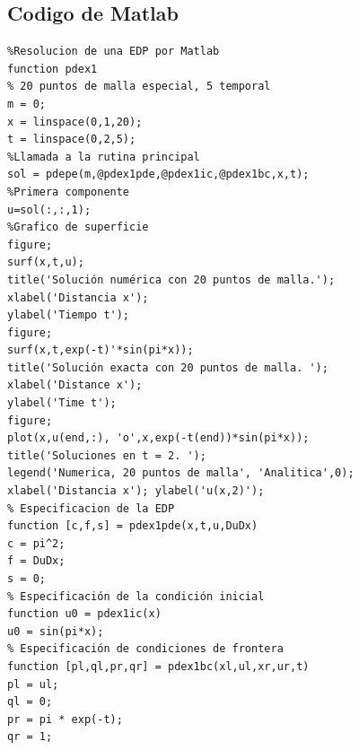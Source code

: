 \documentclass[10pt,a4paper]{article}
\begin{document}
\subsection{Codigo de Matlab}
\begin{verbatim}
%Resolucion de una EDP por Matlab
function pdex1
% 20 puntos de malla especial, 5 temporal
m = 0;
x = linspace(0,1,20);
t = linspace(0,2,5);
%Llamada a la rutina principal
sol = pdepe(m,@pdex1pde,@pdex1ic,@pdex1bc,x,t);
%Primera componente
u=sol(:,:,1);
%Grafico de superficie
figure;
surf(x,t,u);
title('Solución numérica con 20 puntos de malla.');
xlabel('Distancia x');
ylabel('Tiempo t');
figure;
surf(x,t,exp(-t)'*sin(pi*x));
title('Solución exacta con 20 puntos de malla. ');
xlabel('Distance x');
ylabel('Time t');
figure;
plot(x,u(end,:), 'o',x,exp(-t(end))*sin(pi*x));
title('Soluciones en t = 2. ');
legend('Numerica, 20 puntos de malla', 'Analitica',0);
xlabel('Distancia x'); ylabel('u(x,2)');
% Especificacion de la EDP
function [c,f,s] = pdex1pde(x,t,u,DuDx)
c = pi^2;
f = DuDx;
s = 0;
% Especificación de la condición inicial
function u0 = pdex1ic(x)
u0 = sin(pi*x);
% Especificación de condiciones de frontera
function [pl,ql,pr,qr] = pdex1bc(xl,ul,xr,ur,t)
pl = ul;
ql = 0;
pr = pi * exp(-t);
qr = 1; 

\end{verbatim}
\end{document}
